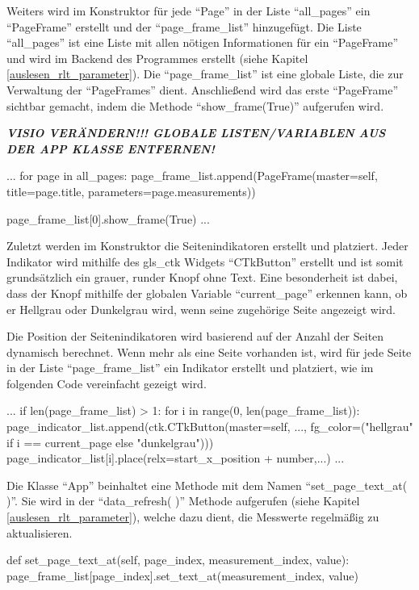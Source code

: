 Weiters wird im Konstruktor für jede \enquote{Page} in der Liste \enquote{all\_pages} ein \enquote{PageFrame} erstellt und der \enquote{page\_frame\_list} hinzugefügt. Die Liste \enquote{all\_pages} ist eine Liste mit allen nötigen Informationen für ein \enquote{PageFrame} und wird im Backend des Programmes erstellt (siehe Kapitel \ref{auslesen_rlt_parameter}). Die \enquote{page\_frame\_list} ist eine globale Liste, die zur Verwaltung der \enquote{PageFrames} dient. Anschließend wird das erste \enquote{PageFrame} sichtbar gemacht, indem die Methode \enquote{show\_frame(True)} aufgerufen wird.

\textbf{\textit{VISIO VERÄNDERN!!! GLOBALE LISTEN/VARIABLEN AUS DER APP KLASSE ENTFERNEN!}}

\begin{pythoncode}
...	
		for page in all_pages:
			page_frame_list.append(PageFrame(master=self, title=page.title, parameters=page.measurements))
   
		page_frame_list[0].show_frame(True)
...
\end{pythoncode}

Zuletzt werden im Konstruktor die Seitenindikatoren erstellt und platziert. Jeder Indikator wird mithilfe des \gls{gls_ctk} Widgets \enquote{CTkButton} erstellt und ist somit grundsätzlich ein grauer, runder Knopf ohne Text. Eine besonderheit ist dabei, dass der Knopf mithilfe der globalen Variable \enquote{current\_page} erkennen kann, ob er Hellgrau oder Dunkelgrau wird, wenn seine zugehörige Seite angezeigt wird.

Die Position der Seitenindikatoren wird basierend auf der Anzahl der Seiten dynamisch berechnet. Wenn mehr als eine Seite vorhanden ist, wird für jede Seite in der Liste \enquote{page\_frame\_list} ein Indikator erstellt und platziert, wie im folgenden Code vereinfacht gezeigt wird.

\begin{pythoncode}
...
		if len(page_frame_list) > 1:
			for i in range(0, len(page_frame_list)):
				page_indicator_list.append(ctk.CTkButton(master=self, ..., fg_color=("hellgrau" if i == current_page else "dunkelgrau")))
				page_indicator_list[i].place(relx=start_x_position + number,...)
...
\end{pythoncode}

Die Klasse \enquote{App} beinhaltet eine Methode mit dem Namen \enquote{set\_page\_text\_at( )}. Sie wird in der \enquote{data\_refresh( )} Methode aufgerufen (siehe Kapitel \ref{auslesen_rlt_parameter}), welche dazu dient, die Messwerte regelmäßig zu aktualisieren.

\begin{pythoncode}
	def set_page_text_at(self, page_index, measurement_index, value):
    	page_frame_list[page_index].set_text_at(measurement_index, value)
\end{pythoncode}
